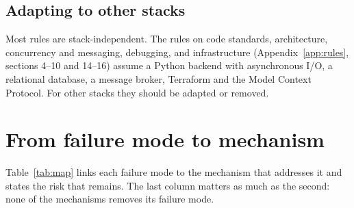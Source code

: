 \documentclass[11pt,a4paper]{article}
\begin{document}
\subsection{Adapting to other stacks}\label{sec:stacks}

Most rules are stack-independent. The rules on code standards, architecture, concurrency and messaging, debugging, and infrastructure (Appendix~\ref{app:rules}, sections 4--10 and 14--16) assume a Python backend with asynchronous I/O, a relational database, a message broker, Terraform and the Model Context Protocol. For other stacks they should be adapted or removed.

\section{From failure mode to mechanism}
\label{sec:map}

Table~\ref{tab:map} links each failure mode to the mechanism that addresses it and states the risk that remains. The last column matters as much as the second: none of the mechanisms removes its failure mode.
\end{document}
